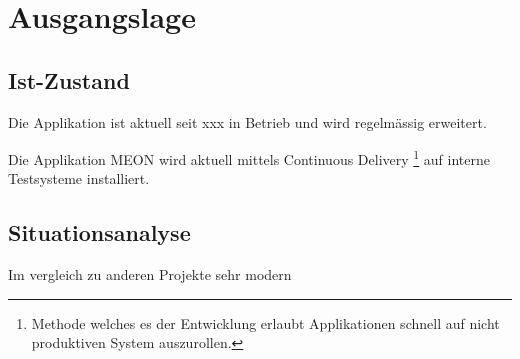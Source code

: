\graphicspath{{./images/}}

\chapter{Ausgangslage}

\section{Ist-Zustand}

Die Applikation ist aktuell seit xxx in Betrieb und wird regelmässig erweitert. 

Die Applikation MEON wird aktuell mittels Continuous Delivery \footnote{Methode welches es der Entwicklung erlaubt Applikationen schnell auf nicht produktiven System auszurollen.} auf interne Testsysteme installiert. 

\section{Situationsanalyse}

Im vergleich zu anderen Projekte sehr modern